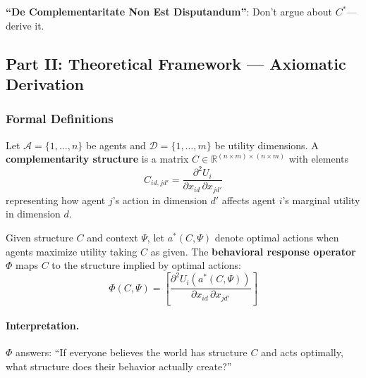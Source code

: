 \textbf{``De Complementaritate Non Est Disputandum''}: Don't argue about
$C^*$---derive it.



\subsection{Part II: Theoretical Framework --- Axiomatic Derivation}
\label{sec:D-axiomatic}

\subsubsection{Formal Definitions}

\begin{definition}
\label{def:D-structure}
Let $\mathcal{A} = \{1, \ldots, n\}$ be agents and
$\mathcal{D} = \{1, \ldots, m\}$ be utility dimensions.
A \textbf{complementarity structure} is a matrix
$C \in \mathbb{R}^{(n \times m) \times (n \times m)}$ with elements
\begin{equation}
C_{id,jd'} = \frac{\partial^2 U_i}{\partial x_{id} \,\partial x_{jd'}}
\end{equation}
representing how agent $j$'s action in dimension $d'$ affects
agent $i$'s marginal utility in dimension $d$.
\end{definition}

\begin{definition}
\label{def:D-operator}
Given structure $C$ and context $\Psi$, let $a^*(C, \Psi)$ denote
optimal actions when agents maximize utility taking $C$ as given.
The \textbf{behavioral response operator} $\Phi$ maps $C$ to the
structure implied by optimal actions:
\begin{equation}
\Phi(C, \Psi) = \left[ \frac{\partial^2 U_i(a^*(C,\Psi))}
                            {\partial x_{id} \,\partial x_{jd'}} \right]
\end{equation}
\end{definition}

\paragraph{Interpretation.}
$\Phi$ answers: ``If everyone believes the world has structure $C$ and acts
optimally, what structure does their behavior actually create?''

